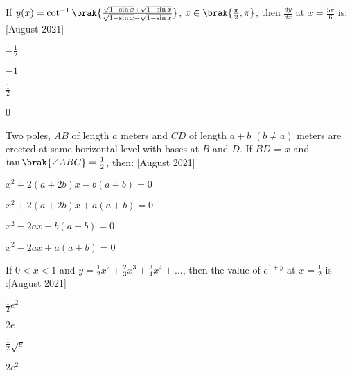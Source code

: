 \iffalse
  \title{2021}
  \author{EE24BTECH11010}
  \section{mcq-single}
\fi
\item If $y(x) = \cot^{-1}\brak{\frac{\sqrt{1 + \sin{x}} + \sqrt{1 - \sin{x}}}{\sqrt{1 + \sin{x}} - \sqrt{1 - \sin{x}}}}$, $x \in \brak{\frac{\pi}{2}, \pi}$, then $\frac{dy}{dx}$ at $x = \frac{5\pi}{6}$ is: \hfill [August 2021]
    \begin{enumerate}
    \begin{multicols}{4}
        \item $-\frac{1}{2}$
        \item $-1$
        \item $\frac{1}{2}$
        \item 0
    \end{multicols}
    \end{enumerate}
    \item Two poles, $AB$ of length $a$ meters and $CD$ of length $ a + b$ $(b \neq a) $ meters are erected at same horizontal level with bases at $B$ and $D$. If $BD$ = $x$ and $\tan\brak{\angle{ABC}} = \frac{1}{2}$, then: \hfill [August 2021]
    \begin{enumerate}
        \begin{multicols}{2}
            \item $x^2 + 2(a + 2b)x - b(a + b) = 0$
            \item $x^2 + 2(a + 2b)x + a(a + b) = 0$
            \item $x^2 - 2ax - b(a + b) = 0$
            \item $x^2 - 2ax + a(a + b) = 0$
        \end{multicols}
    \end{enumerate}
    \item If $0 < x < 1$ and $y = \frac{1}{2}x^2 + \frac{2}{3}x^3 + \frac{3}{4}x^4 + ...$, then the value of $e^{1+y}$ at $x = \frac{1}{2}$ is\\:\hfill [August 2021]
    \begin{enumerate}
        \begin{multicols}{2}
            \item $\frac{1}{2}e^2$
            \item $2e$
            \item $\frac{1}{2}\sqrt{e}$
            \item $2e^2$
        \end{multicols}
    \end{enumerate}
